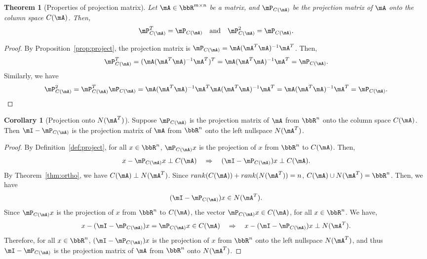 \documentclass[11pt]{article}
\theoremstyle{plain}
\newtheorem{thm}{Theorem}[section]
\theoremstyle{definition}
\newtheorem{cor}{Corollary}
\begin{document}
\begin{thm}[Properties of projection matrix]\label{thm:projectm}
Let $\mA \in \bbR^{m \times n}$ be a matrix, and $\mP_{C(\mA)}$ be the projection matrix of $\mA$ onto the column space $C(\mA)$. Then,
	\begin{equation}\label{eq:projectm}
		\mP_{C(\mA)}^T = \mP_{C(\mA)}\quad \text{and}\quad  \mP_{C(\mA)}^2 = \mP_{C(\mA)}.
	\end{equation}
\end{thm}
\begin{proof}
	By Proposition~\ref{prop:project}, the projection matrix is $\mP_{C(\mA)} =   \mA(\mA^T \mA)^{-1} \mA^T$. Then,
	\[  \mP_{C(\mA)}^T = (\mA(\mA^T \mA)^{-1} \mA^T )^T = \mA (\mA^T \mA)^{-1} \mA^T = \mP_{C(\mA)}. \]
Similarly, we have
	\[  \mP_{C(\mA)}^2 = \mP_{C(\mA)}^T \mP_{C(\mA)} =  \mA (\mA^T \mA)^{-1} \mA^T  \mA (\mA^T \mA)^{-1} \mA^T =  \mA (\mA^T \mA)^{-1} \mA^T = \mP_{C(\mA)}. \]
\end{proof}

\begin{cor}[Projection onto $N(\mA^T)$]\label{cor:iprojectm}
	Suppose $\mP_{C(\mA)}$ is the projection matrix of $\mA$ from $\bbR^n$ onto the column space $C(\mA)$. Then $\mI-\mP_{C(\mA)}$ is the projection matrix of $\mA$ from $\bbR^n$ onto the left nullspace $N(\mA^T)$. 
\end{cor}

\begin{proof}
	By Definition~\ref{def:project}, for all $x \in \bbR^n$, $\mP_{C(\mA)} x$ is the projection of $x$ from $\bbR^n$ to $C(\mA)$. Then,
	\[ x - \mP_{C(\mA)} x \perp C(\mA) \quad \Rightarrow \quad (\mI-\mP_{C(\mA)})x \perp C(\mA). \]
	By Theorem~\ref{thm:ortho}, we have $C(\mA) \perp N(\mA^T)$. Since $rank(C(\mA)) + rank(N(\mA^T)) = n$, $C(\mA)  \cup N(\mA^T) = \bbR^n$. Then, we have
	\[ (\mI-\mP_{C(\mA)})x \in N(\mA^T).\]
	Since $\mP_{C(\mA)} x$ is the projection of $x$ from $\bbR^n$ to $C(\mA)$,  the vector $\mP_{C(\mA)} x \in C(\mA)$, for all  $x \in \bbR^n$. We have,
	\[ x -  (\mI-\mP_{C(\mA)})x = \mP_{C(\mA)} x \in C(\mA) \quad \Rightarrow \quad  x -  (\mI-\mP_{C(\mA)})x \perp N(\mA^T).\]
	Therefore, for all $x \in \bbR^n$, $(\mI-\mP_{C(\mA)})x$ is the projection of $x$ from $\bbR^n$ onto the left nullspace $N(\mA^T)$, and thus $\mI-\mP_{C(\mA)}$ is the projection matrix of $\mA$ from $\bbR^n$ onto $N(\mA^T)$.
\end{proof}
\end{document}
